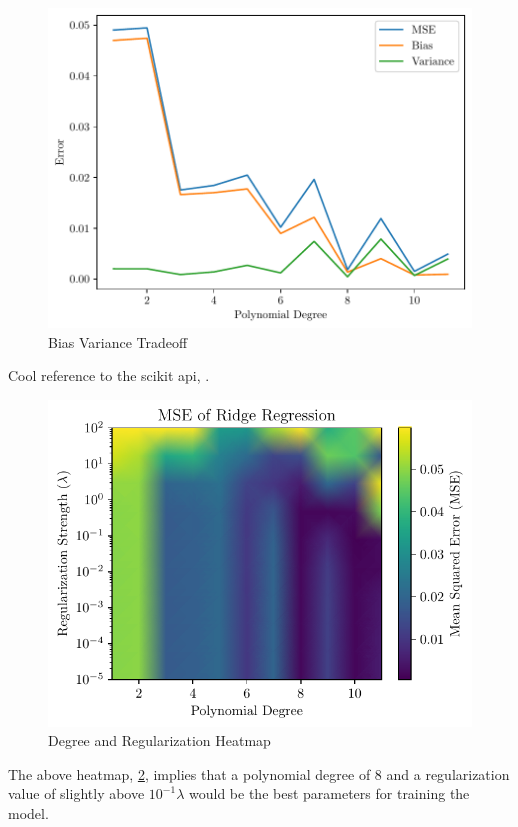 \documentclass[amssymb,twocolumn,aps]{revtex4}
\begin{document}
\begin{figure}[h]
    \centering
    \includegraphics[width=0.9 \linewidth]{Figures/bias_variance_tradeoff.pdf}
    \caption{Bias Variance Tradeoff}
    \label{fig:BiasVariance1}
\end{figure}
Cool reference to the scikit api, \cite{sklearn_api}.


\begin{figure}[h]
    \centering
    \includegraphics[width=0.9 \linewidth]{Figures/ridge_heatmap.pdf}
    \caption{Degree and Regularization Heatmap}
    \label{fig:DegRegHeat}
\end{figure}
The above heatmap, \ref{fig:DegRegHeat}, implies that a polynomial degree of 8 and a regularization value of slightly above $10^{-1} \lambda$ would be the best parameters for training the model.
\end{document}
